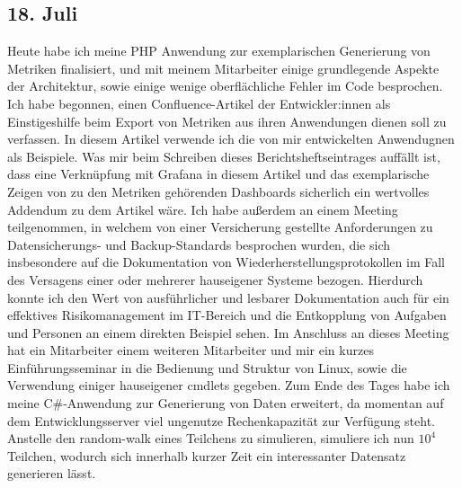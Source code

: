 \subsection{18. Juli}
Heute habe ich meine PHP Anwendung zur exemplarischen Generierung von Metriken finalisiert, und mit meinem Mitarbeiter einige grundlegende Aspekte der Architektur, sowie einige wenige oberflächliche Fehler im Code besprochen. Ich habe begonnen, einen Confluence-Artikel der Entwickler:innen als Einstigeshilfe beim Export von Metriken aus ihren Anwendungen dienen soll zu verfassen. In diesem Artikel verwende ich die von mir entwickelten Anwendugnen als Beispiele. Was mir beim Schreiben dieses Berichtsheftseintrages auffällt ist, dass eine Verknüpfung mit Grafana in diesem Artikel und das exemplarische Zeigen von zu den Metriken gehörenden Dashboards sicherlich ein wertvolles Addendum zu dem Artikel wäre.
Ich habe außerdem an einem Meeting teilgenommen, in welchem von einer Versicherung gestellte Anforderungen zu Datensicherungs- und Backup-Standards besprochen wurden, die sich insbesondere auf die Dokumentation von Wiederherstellungsprotokollen im Fall des Versagens einer oder mehrerer hauseigener Systeme bezogen. Hierdurch konnte ich den Wert von ausführlicher und lesbarer Dokumentation auch für ein effektives Risikomanagement im IT-Bereich und die Entkopplung von Aufgaben und Personen an einem direkten Beispiel sehen. Im Anschluss an dieses Meeting hat ein Mitarbeiter einem weiteren Mitarbeiter und mir ein kurzes Einführungsseminar in die Bedienung und Struktur von Linux, sowie die Verwendung einiger hauseigener cmdlets gegeben.
Zum Ende des Tages habe ich meine C\#-Anwendung zur Generierung von Daten erweitert, da momentan auf dem Entwicklungsserver viel ungenutze Rechenkapazität zur Verfügung steht. Anstelle den random-walk eines Teilchens zu simulieren, simuliere ich nun $10^4$ Teilchen, wodurch sich innerhalb kurzer Zeit ein interessanter Datensatz generieren lässt.
